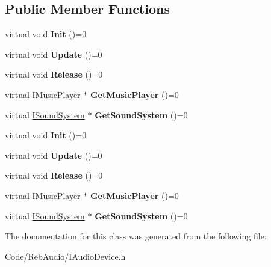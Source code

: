 \subsection*{Public Member Functions}
\begin{DoxyCompactItemize}
\item 
virtual void {\bfseries Init} ()=0\hypertarget{class_i_audio_device_ab819d541358d62bfa59b2302b1d1f765}{}\label{class_i_audio_device_ab819d541358d62bfa59b2302b1d1f765}

\item 
virtual void {\bfseries Update} ()=0\hypertarget{class_i_audio_device_a4f234dd08f905d0abb725e0d7d318f51}{}\label{class_i_audio_device_a4f234dd08f905d0abb725e0d7d318f51}

\item 
virtual void {\bfseries Release} ()=0\hypertarget{class_i_audio_device_acc1db87ba1ed58e05a542e9ade40a6bf}{}\label{class_i_audio_device_acc1db87ba1ed58e05a542e9ade40a6bf}

\item 
virtual \hyperlink{class_i_music_player}{I\+Music\+Player} $\ast$ {\bfseries Get\+Music\+Player} ()=0\hypertarget{class_i_audio_device_aeff9acea53b58f0b487dc87a908e09d4}{}\label{class_i_audio_device_aeff9acea53b58f0b487dc87a908e09d4}

\item 
virtual \hyperlink{class_i_sound_system}{I\+Sound\+System} $\ast$ {\bfseries Get\+Sound\+System} ()=0\hypertarget{class_i_audio_device_a898651a65ececae379d2794474ab2804}{}\label{class_i_audio_device_a898651a65ececae379d2794474ab2804}

\item 
virtual void {\bfseries Init} ()=0\hypertarget{class_i_audio_device_ab819d541358d62bfa59b2302b1d1f765}{}\label{class_i_audio_device_ab819d541358d62bfa59b2302b1d1f765}

\item 
virtual void {\bfseries Update} ()=0\hypertarget{class_i_audio_device_a4f234dd08f905d0abb725e0d7d318f51}{}\label{class_i_audio_device_a4f234dd08f905d0abb725e0d7d318f51}

\item 
virtual void {\bfseries Release} ()=0\hypertarget{class_i_audio_device_acc1db87ba1ed58e05a542e9ade40a6bf}{}\label{class_i_audio_device_acc1db87ba1ed58e05a542e9ade40a6bf}

\item 
virtual \hyperlink{class_i_music_player}{I\+Music\+Player} $\ast$ {\bfseries Get\+Music\+Player} ()=0\hypertarget{class_i_audio_device_aeff9acea53b58f0b487dc87a908e09d4}{}\label{class_i_audio_device_aeff9acea53b58f0b487dc87a908e09d4}

\item 
virtual \hyperlink{class_i_sound_system}{I\+Sound\+System} $\ast$ {\bfseries Get\+Sound\+System} ()=0\hypertarget{class_i_audio_device_a898651a65ececae379d2794474ab2804}{}\label{class_i_audio_device_a898651a65ececae379d2794474ab2804}

\end{DoxyCompactItemize}


The documentation for this class was generated from the following file\+:\begin{DoxyCompactItemize}
\item 
Code/\+Reb\+Audio/I\+Audio\+Device.\+h\end{DoxyCompactItemize}
